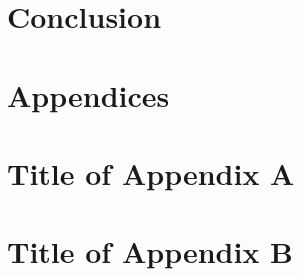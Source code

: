 \documentclass{article}
\begin{document}

\section{Conclusion}
\label{sec:conclusion}



\newpage
\section{Appendices}

\appendix
\section{Title of Appendix A}
\section{Title of Appendix B}



\end{document}
